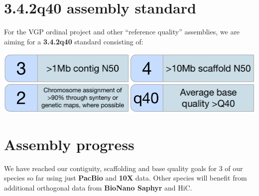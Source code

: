 \documentclass[a0,portrait]{a0poster}
\begin{document}
\begin{multicols}{2}
{\center\begin{tcolorbox}[boxsep=25pt,width=0.6\linewidth,colback=sangerlightblue3,arc=20pt]
\large{}
\end{tcolorbox}}

\vfill
\columnbreak


\section*{3.4.2q40 assembly standard}

\noindent For the VGP ordinal project and other ``reference quality'' assemblies, we are aiming for a \textbf{3.4.2q40} standard consisting of:

\vspace{0.5cm}

\begin{center}
\includegraphics[width=0.6\linewidth]{images/score.pdf}
\end{center}


\section*{Assembly progress}

\noindent We have reached our contiguity, scaffolding and base quality goals for 3 of our species so far using just \textbf{PacBio} and \textbf{10X} data. Other species will benefit from additional orthogonal data from \textbf{BioNano Saphyr} and HiC.


\end{multicols}
\end{document}
